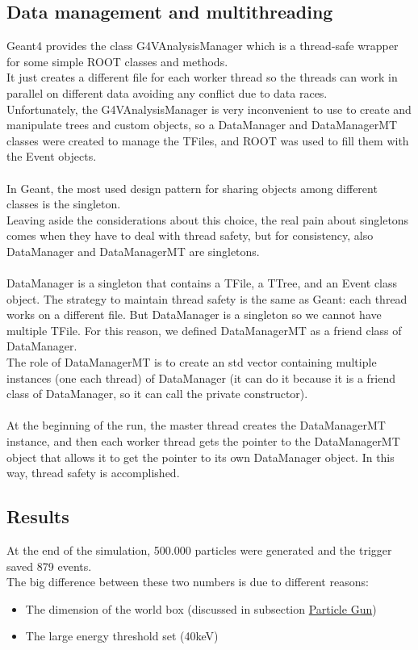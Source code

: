 \documentclass[10pt, a4paper, twocolumn]{article} %
\begin{document}
\subsection{Data management and multithreading}
Geant4 provides the class G4VAnalysisManager which is a thread-safe wrapper for some simple ROOT classes and methods.\\
It just creates a different file for each worker thread so the threads can work in parallel on different data avoiding any conflict due to data races.
\\
Unfortunately, the G4VAnalysisManager is very inconvenient to use to create and manipulate trees and custom objects, so a DataManager and DataManagerMT classes were created to manage the TFiles, and ROOT was used to fill them with the Event objects.
\\
\\
In Geant, the most used design pattern for sharing objects among different classes is the singleton.
\\
Leaving aside the considerations about this choice, the real pain about singletons comes when they have to deal with thread safety, but for consistency, also DataManager and DataManagerMT are singletons.
\\
\\
DataManager is a singleton that contains a TFile, a TTree, and an Event class object.
The strategy to maintain thread safety is the same as Geant: each thread works on a different file. But DataManager is a singleton so we cannot have multiple TFile. For this reason, we defined DataManagerMT as a friend class of DataManager.
\\
The role of DataManagerMT is to create an std vector containing multiple instances (one each thread)
 of DataManager (it can do it because it is a friend class of DataManager, so it can call the private constructor).
 \\
 \\
 At the beginning of the run, the master thread creates the DataManagerMT instance, and then each worker thread gets the pointer to the DataManagerMT object that allows it to get the pointer to its own DataManager object.
 In this way, thread safety is accomplished.

\subsection{Results}
At the end of the simulation, 500.000 particles were generated and the trigger saved 879 events.\\
The big difference between these two numbers is due to different reasons:
\begin{itemize}
    \item The dimension of the world box (discussed in subsection \hyperref[ssec:PG]{Particle Gun})
    \item The large energy threshold set (40keV)
\end{itemize}
\end{document}
